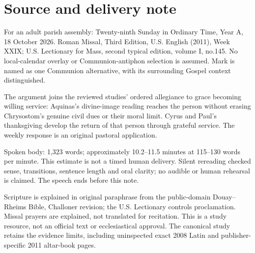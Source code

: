 \section{Source and delivery note}
For an adult parish assembly: Twenty-ninth Sunday in Ordinary Time, Year A, 18 October 2026. Roman Missal, Third Edition, U.S. English (2011), Week XXIX; U.S. Lectionary for Mass, second typical edition, volume I, no.145. No local-calendar overlay or Communion-antiphon selection is assumed. Mark is named as one Communion alternative, with its surrounding Gospel context distinguished.

The argument joins the reviewed studies' ordered allegiance to grace becoming willing service: Aquinas's divine-image reading reaches the person without erasing Chrysostom's genuine civil dues or their moral limit. Cyrus and Paul's thanksgiving develop the return of that person through grateful service. The weekly response is an original pastoral application.

Spoken body: 1,323 words; approximately 10.2--11.5 minutes at 115--130 words per minute. This estimate is not a timed human delivery. Silent rereading checked sense, transitions, sentence length and oral clarity; no audible or human rehearsal is claimed. The speech ends before this note.

Scripture is explained in original paraphrase from the public-domain Douay--Rheims Bible, Challoner revision; the U.S. Lectionary controls proclamation. Missal prayers are explained, not translated for recitation. This is a study resource, not an official text or ecclesiastical approval. The canonical study retains the evidence limits, including uninspected exact 2008 Latin and publisher-specific 2011 altar-book pages.

